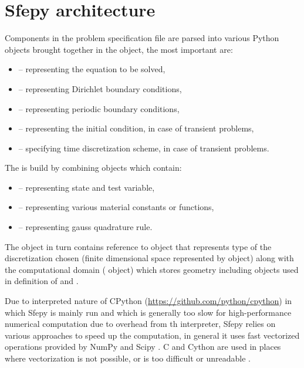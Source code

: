 \section{Sfepy architecture}
Components in the problem specification file are parsed into various Python objects  
brought together in the  object, the most important are:
\begin{itemize}
	\item {} -- representing the equation to be solved,
	\item {} -- representing Dirichlet boundary conditions,
	\item {} -- representing periodic boundary conditions,
	\item {} -- representing the initial condition, in case of transient problems,
	\item {} -- specifying time discretization scheme, in case of transient problems.
\end{itemize}
The  is build by combining  objects which contain:
\begin{itemize}
	\item {} -- representing state and test variable,
	\item {} -- representing various material constants or functions,
	\item {} -- representing gauss quadrature rule.
\end{itemize}
The  object in turn contains reference to  object that represents type of the 
discretization chosen (finite dimensional space represented by  object) along with the computational 
domain ( object) which stores geometry including
 objects used in definition of  and .

Due to interpreted nature of CPython (\url{https://github.com/python/cpython}) in which 
Sfepy is mainly run and which is generally too slow for high-performance numerical 
computation due to overhead from th interpreter, Sfepy relies on various approaches to 
speed up the computation, in general it uses fast vectorized operations provided by NumPy 
and Scipy \cite{SciPy-NMeth2020}. C and Cython are used in places where vectorization is 
not possible, or is too difficult or unreadable \cite{Cimrman_Lukes_Rohan_2019}. 











